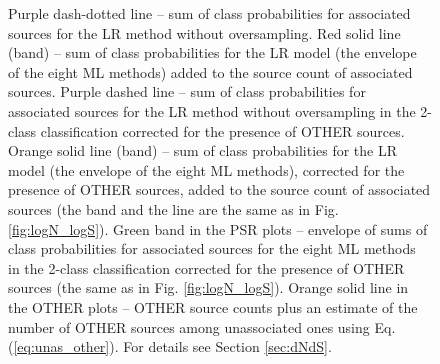 \begin{figure}[h]
{Purple dash-dotted line -- sum of class probabilities for associated sources for the LR method without oversampling.
Red solid line (band) -- sum of class probabilities for the LR model (the envelope of the eight ML methods) added to the source count of associated sources. 
Purple dashed line -- sum of class probabilities for associated sources for the LR method without oversampling in the 2-class classification corrected for the presence of OTHER sources.
Orange solid line (band) -- sum of class probabilities for the LR model (the envelope of the eight ML methods), corrected for the presence of OTHER sources, added to the source count of associated sources (the band and the line are the same as in Fig. \ref{fig:logN_logS}).
Green band in the PSR plots -- envelope of sums of class probabilities for associated sources for the eight ML methods in the 2-class classification corrected for the presence of OTHER sources (the same as in Fig. \ref{fig:logN_logS}).
Orange solid line in the OTHER plots -- OTHER source counts plus an estimate of the number of OTHER sources among unassociated ones using Eq. (\ref{eq:unas_other}). 
For details see Section \ref{sec:dNdS}.
}  
\label{fig:logN_logS_3classes}
\end{figure}



